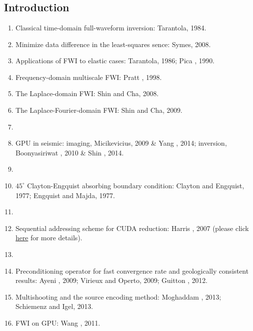 \renewcommand{\pmk}{Yang\_2015\_Geophy\_GPU implementation of FWI}
\renewcommand{\prf}{FWI/\pmk.pdf}
\renewcommand{\pti}{A graphics processing unit implementation of
  time-domain full-waveform inversion}
\renewcommand{\pay}{Pengliang Yang, Jinghuai Gao, and Baoli Wang, 2015}
\renewcommand{\pjo}{Geophysics}
\renewcommand{\pda}{2019/2/28 Thu.}

\section{\pinfo}

\subsection{Introduction}
\begin{enumerate}[\hspace{10mm}*]
  \item Classical time-domain full-waveform inversion: Tarantola, 1984.
  \item Minimize data difference in the least-squares sence: Symes, 2008.
  \item Applications of FWI to elastic cases: Tarantola, 1986; Pica \etal, 1990.
  \item Frequency-domain multiscale FWI: Pratt \etal, 1998.
  \item The Laplace-domain FWI: Shin and Cha, 2008.
  \item The Laplace-Fourier-domain FWI: Shin and Cha, 2009.
  \item \sline
  \item GPU in seismic: imaging, Micikevicius, 2009 \& Yang \etal, 2014;
    inversion, Boonyasiriwat \etal, 2010 \& Shin \etal, 2014.
  \item \sline
  \item $45^\circ$ Clayton-Engquist absorbing boundary condition:
    Clayton and Engquist, 1977; Engquist and Majda, 1977.
  \item \sline
  \item Sequential addressing scheme for CUDA reduction: Harris \etal, 2007
    (please click \href{http://vuduc.org/teaching/cse6230-hpcta-fa12/slides/cse6230-fa12--05b-reduction-notes.pdf}{here}
    for more details).
  \item \sline
  \item Preconditioning operator for fast convergence rate and
    geologically consistent results: Ayeni \etal, 2009;
    Virieux and Operto, 2009; Guitton \etal, 2012.
  \item Multishooting and the source encoding method:
    Moghaddam \etal, 2013; Schiemenz and Igel, 2013.
  \item FWI on GPU: Wang \etal, 2011.
\end{enumerate}


